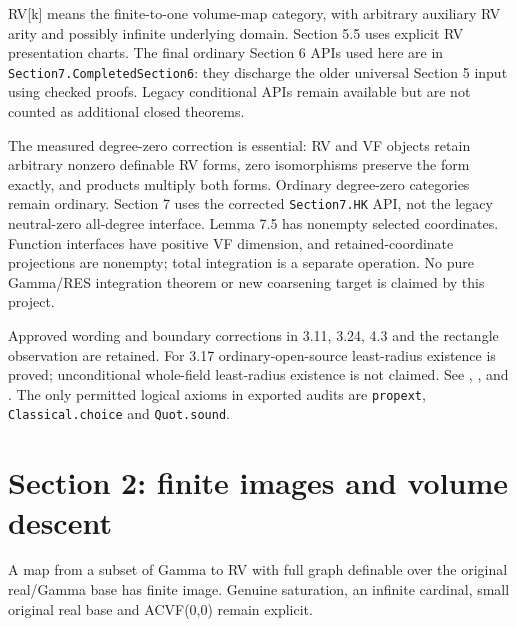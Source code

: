 RV[k] means the finite-to-one volume-map category, with arbitrary auxiliary RV
arity and possibly infinite underlying domain. Section 5.5 uses explicit RV
presentation charts. The final ordinary Section 6 APIs used here are in
\texttt{Section7.CompletedSection6}: they discharge the older universal
Section 5 input using checked proofs. Legacy conditional APIs remain available
but are not counted as additional closed theorems.

The measured degree-zero correction is essential: RV and VF objects retain
arbitrary nonzero definable RV forms, zero isomorphisms preserve the form
exactly, and products multiply both forms. Ordinary degree-zero categories
remain ordinary. Section 7 uses the corrected \texttt{Section7.HK} API,
not the legacy neutral-zero all-degree interface.
Lemma 7.5 has nonempty selected coordinates. Function interfaces have positive
VF dimension, and retained-coordinate projections are nonempty; total
integration is a separate operation. No pure Gamma/RES integration theorem
or new coarsening target is claimed by this project.

Approved wording and boundary corrections in 3.11, 3.24, 4.3 and the rectangle
observation are retained. For 3.17 ordinary-open-source least-radius existence
is proved; unconditional whole-field least-radius existence is not claimed.
See ,
, and
.
The only permitted logical axioms in exported audits are
\texttt{propext}, \texttt{Classical.choice} and \texttt{Quot.sound}.



\section{Section 2: finite images and volume descent}


\begin{corollary}

\label{s2-finite}


\leanok

A map from a subset of Gamma to RV with full graph definable over the original real/Gamma base has finite image. Genuine saturation, an infinite cardinal, small original real base and ACVF(0,0) remain explicit.

\end{corollary}

